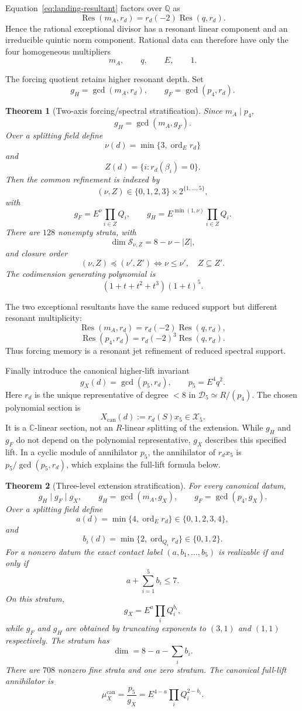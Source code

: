 \documentclass[11pt]{amsart}
\newtheorem{theorem}{Theorem}[section]
\newcommand{\C}{\mathbb C}
\newcommand{\Q}{\mathbb Q}
\begin{document}
Equation~\eqref{eq:landing-resultant} factors over $\Q$ as
\[
\operatorname{Res}(m_A,r_d)
=r_d(-2)\operatorname{Res}(q,r_d).
\]
Hence the rational exceptional divisor has a resonant linear component and an irreducible quintic norm component.  Rational data can therefore have only the four homogeneous multipliers
\[
m_A,
\qquad q,
\qquad E,
\qquad1.
\]

The forcing quotient retains higher resonant depth.  Set
\[
g_H=\gcd(m_A,r_d),
\qquad
g_F=\gcd(p_4,r_d).
\]

\begin{theorem}[Two-axis forcing/spectral stratification]\label{thm:two-axis}
Since $m_A\mid p_4$,
\[
\boxed{g_H=\gcd(m_A,g_F).}
\]
Over a splitting field define
\[
\nu(d)=\min\{3,\operatorname{ord}_{E}r_d\}
\]
and
\[
Z(d)=\{i:r_d(\beta_i)=0\}.
\]
Then the common refinement is indexed by
\[
(\nu,Z)\in\{0,1,2,3\}\times2^{\{1,\ldots,5\}},
\]
with
\[
\boxed{
g_F=E^\nu\prod_{i\in Z}Q_i,
\qquad
g_H=E^{\min(1,\nu)}\prod_{i\in Z}Q_i.
}
\]
There are $128$ nonempty strata, with
\[
\dim\mathscr S_{\nu,Z}=8-\nu-|Z|,
\]
and closure order
\[
(\nu,Z)\preceq(\nu',Z')
\iff
\nu\le\nu',\quad Z\subseteq Z'.
\]
The codimension generating polynomial is
\[
(1+t+t^2+t^3)(1+t)^5.
\]
\end{theorem}

The two exceptional resultants have the same reduced support but different resonant multiplicity:
\[
\operatorname{Res}(m_A,r_d)=r_d(-2)\operatorname{Res}(q,r_d),
\]
\[
\operatorname{Res}(p_4,r_d)=r_d(-2)^3\operatorname{Res}(q,r_d).
\]
Thus forcing memory is a resonant jet refinement of reduced spectral support.

Finally introduce the canonical higher-lift invariant
\[
g_X(d)=\gcd(p_5,r_d),
\qquad
p_5=E^4q^2.
\]
Here $r_d$ is the unique representative of degree $<8$ in
$\mathscr D_5\simeq R/(p_4)$. The chosen polynomial section is
\[
X_{\mathrm{can}}(d):=r_d(S)x_5\in\mathcal X_5.
\]
It is a $\C$-linear section, not an $R$-linear splitting of the extension.
While $g_H$ and $g_F$ do not depend on the polynomial representative,
$g_X$ describes this specified lift. In a cyclic module of annihilator
$p_5$, the annihilator of $r_dx_5$ is $p_5/\gcd(p_5,r_d)$,
which explains the full-lift formula below.

\begin{theorem}[Three-level extension stratification]\label{thm:three-level}
For every canonical datum,
\[
\boxed{
g_H\mid g_F\mid g_X,
\qquad
g_H=\gcd(m_A,g_X),
\qquad
g_F=\gcd(p_4,g_X).
}
\]
Over a splitting field define
\[
a(d)=\min\{4,\operatorname{ord}_{E}r_d\}\in\{0,1,2,3,4\},
\]
and
\[
b_i(d)=\min\{2,\operatorname{ord}_{Q_i}r_d\}\in\{0,1,2\}.
\]
For a nonzero datum the exact contact label $(a,b_1,\ldots,b_5)$ is realizable if and only if
\[
\boxed{a+\sum_{i=1}^5b_i\le7.}
\]
On this stratum,
\[
\boxed{
g_X=E^a\prod_iQ_i^{b_i},
}
\]
while $g_F$ and $g_H$ are obtained by truncating exponents to $(3,1)$ and $(1,1)$ respectively.  The stratum has
\[
\boxed{
\dim=8-a-\sum_ib_i.
}
\]
There are $708$ nonzero fine strata and one zero stratum.  The canonical full-lift annihilator is
\[
\boxed{
\mu_X^{\mathrm{can}}=\frac{p_5}{g_X}
=E^{4-a}\prod_iQ_i^{2-b_i}.
}
\]
\end{theorem}
\end{document}
